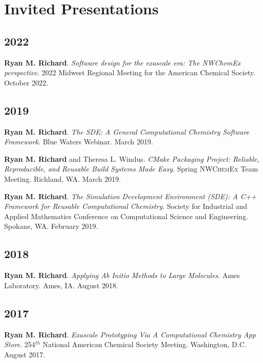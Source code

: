 \documentclass[11pt,a4paper,sans]{moderncv}
\begin{document}
\section{Invited Presentations}
\vspace{5pt}
\begin{etaremune}
    \item[]{}
	\subsection{2022}
    \item{\textbf{Ryan M. Richard}. \textit{Software design for the exascale era: The NWChemEx perspective}. 2022 Midwest Regional Meeting for the American Chemical Society. October 2022.}
	\subsection{2019}
	\item{\textbf{Ryan M. Richard}. \textit{The SDE: A General Computational Chemistry Software Framework}. Blue Waters Webinar. March 2019.}
	\item{\textbf{Ryan M. Richard} and Theresa L. Windus. \textit{CMake Packaging Project: Reliable, Reproducible, and Reusable Build Systems Made Easy}. Spring \textsc{NWChemEx} Team Meeting. Richland, WA. March 2019.}
	\item{\textbf{Ryan M. Richard}. \textit{The Simulation Development Environment (SDE): A C++ Framework for Reusable Computational Chemistry}. Society for Industrial and Applied Mathematics Conference on Computational Science and Engineering. Spokane, WA. February 2019.}

	\subsection{2018}
	\item{\textbf{Ryan M. Richard}. \textit{Applying Ab Initio Methods to Large Molecules}. Ames Laboratory.  Ames, IA. August 2018.}

	\subsection{2017}
	\item{\textbf{Ryan M. Richard}. \textit{Exascale Prototyping Via A Computational Chemistry App Store}. 254$^{th}$ National American Chemical Society Meeting.  Washington, D.C. August 2017.}


\end{etaremune}
\end{document}
